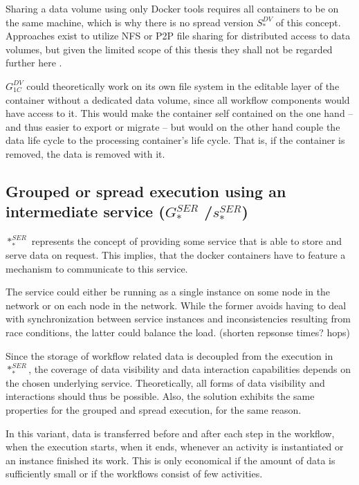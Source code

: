   Sharing a data volume using only Docker tools requires all containers to be on the same machine, which is why there is no spread version $S_{*}^{DV}$ of this concept. Approaches exist to utilize \ac{NFS} or \ac{P2P} file sharing for distributed access to data volumes, but given the limited scope of this thesis they shall not be regarded further here \cite{Miell2015How}.

  $G_{1C}^{DV}$ could theoretically work on its own file system in the editable layer of the container without a dedicated data volume, since all workflow components would have access to it. This would make the container self contained on the one hand -- and thus easier to export or migrate -- but would on the other hand couple the data life cycle to the processing container's life cycle. That is, if the container is removed, the data is removed with it.


\subsection[Grouped or spread execution using an intermediate service]{Grouped or spread execution using an intermediate service ($G_{*}^{SER}$ /$s_{*}^{SER}$)} %
\label{sub:grouped_execution_using_a_intermediate_service}

  $*_{*}^{SER}$ represents the concept of providing some service that is able to store and serve data on request. This implies, that the docker containers have to feature a mechanism to communicate to this service.

  The service could either be running as a single instance on some node in the network or on each node in the network. While the former avoids having to deal with synchronization between service instances and inconsistencies resulting from race conditions, the latter could balance the load. (shorten repsonse times? hops)

  Since the storage of workflow related data is decoupled from the execution in $*_{*}^{SER}$, the coverage of data visibility and data interaction capabilities depends on the chosen underlying service. Theoretically, all forms of data visibility and interactions should thus be possible. Also, the solution exhibits the same properties for the grouped and spread execution, for the same reason.

  In this variant, data is transferred before and after each step in the workflow, \ie when the execution starts, when it ends, whenever an activity is instantiated or an instance finished its work. This is only economical if the amount of data is sufficiently small or if the workflows consist of few activities.


